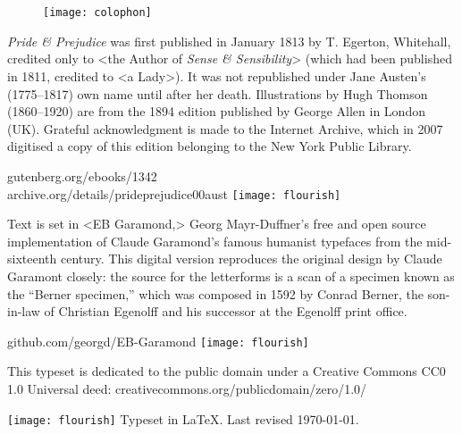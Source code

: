 \documentclass[
paper=5.5in:8.5in,
]{scrbook}
\begin{document}


\renewcommand*{\chapterheadendvskip}{\vfill}
\renewcommand*{\chapterheadstartvskip}{\vfill}

\chapter*{}

\centering

\begin{figure}[t!]
\centering
\texttt{[image: colophon]}
\end{figure}
\vfill
\begin{minipage}{\textwidth}
\textit{Pride \& Prejudice} was first published in January 1813 by T. Egerton, Whitehall, credited only to <the Author of \textit{Sense \& Sensibility}> (which had been published in 1811, credited to <a Lady>). It was not republished under Jane Austen's (1775--1817) own name until after her death. Illustrations by Hugh Thomson (1860--1920) are from the 1894 edition published by George Allen in London (UK). Grateful acknowledgment is made to the Internet Archive, which in 2007 digitised a copy of this edition belonging to the New York Public Library.
\end{minipage}
\vfill
gutenberg.org/ebooks/1342\\archive.org/details/prideprejudice00aust
\vfill
\texttt{[image: flourish]}
\vfill
\begin{minipage}{\textwidth}
Text is set in <EB Garamond,> Georg Mayr-Duffner's free and open source implementation of Claude Garamond’s famous humanist typefaces from the mid-sixteenth century. This digital version reproduces the original design by Claude Garamont closely: the source for the letterforms is a scan of a specimen known as the \enquote{Berner specimen,} which was composed in 1592 by Conrad Berner, the son-in-law of Christian Egenolff and his successor at the Egenolff print office.
\end{minipage}
\vfill
github.com/georgd/EB-Garamond
\vfill
\texttt{[image: flourish]}
\vfill
\begin{minipage}{\textwidth}
This typeset is dedicated to the public domain under a Creative Commons CC0 1.0 Universal deed: creativecommons.org/publicdomain/zero/1.0/\\
\end{minipage}
\vfill
\texttt{[image: flourish]}
\vfill
Typeset in \LaTeX{}. Last revised \today.
\thispagestyle{empty}
\end{document}
